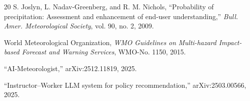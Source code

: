 \documentclass[conference]{IEEEtran}
\begin{document}
\begin{thebibliography}{20}
S. Joslyn, L. Nadav-Greenberg, and R. M. Nichols, ``Probability of precipitation: Assessment and enhancement of end-user understanding,'' \emph{Bull. Amer. Meteorological Society}, vol. 90, no. 2, 2009.

World Meteorological Organization, \emph{WMO Guidelines on Multi-hazard Impact-based Forecast and Warning Services}, WMO-No. 1150, 2015.

``AI-Meteorologist,'' arXiv:2512.11819, 2025.

``Instructor--Worker LLM system for policy recommendation,'' arXiv:2503.00566, 2025.

\end{thebibliography}
\end{document}
